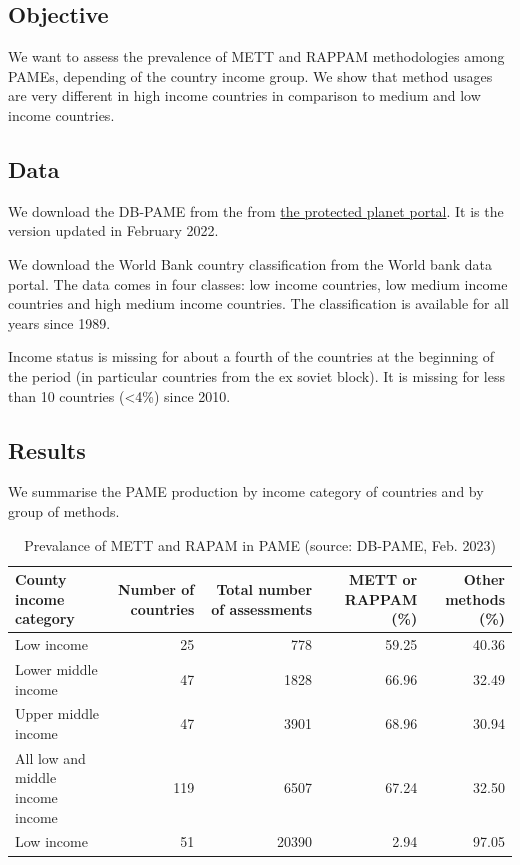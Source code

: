 \documentclass[
  letterpaper,
  DIV=11,
  numbers=noendperiod]{scrartcl}
\begin{document}
\hypertarget{objective-1}{%
\subsection{Objective}\label{objective-1}}

We want to assess the prevalence of METT and RAPPAM methodologies among
PAMEs, depending of the country income group. We show that method usages
are very different in high income countries in comparison to medium and
low income countries.

\hypertarget{data-1}{%
\subsection{Data}\label{data-1}}

We download the DB-PAME from the from
\href{https://pame.protectedplanet.net/}{the protected planet portal}.
It is the version updated in February 2022.

We download the World Bank country classification from the World bank
data portal. The data comes in four classes: low income countries, low
medium income countries and high medium income countries. The
classification is available for all years since 1989.

Income status is missing for about a fourth of the countries at the
beginning of the period (in particular countries from the ex soviet
block). It is missing for less than 10 countries (\textless4\%) since
2010.

\hypertarget{results-1}{%
\subsection{Results}\label{results-1}}

We summarise the PAME production by income category of countries and by
group of methods.

\begin{longtable}{lrrrr}
\caption{Prevalance of METT and RAPAM in PAME (source: DB-PAME, Feb. 2023)}\tabularnewline

\toprule
County income category & Number of countries & Total number of assessments & METT or RAPPAM (\%) & Other methods (\%) \\ 
\midrule
Low income & 25 & 778 & 59.25 & 40.36 \\ 
Lower middle income & 47 & 1828 & 66.96 & 32.49 \\ 
Upper middle income & 47 & 3901 & 68.96 & 30.94 \\ 
All low and middle income income & 119 & 6507 & 67.24 & 32.50 \\ 
Low income & 51 & 20390 & 2.94 & 97.05 \\ 
\bottomrule
\end{longtable}
\end{document}
